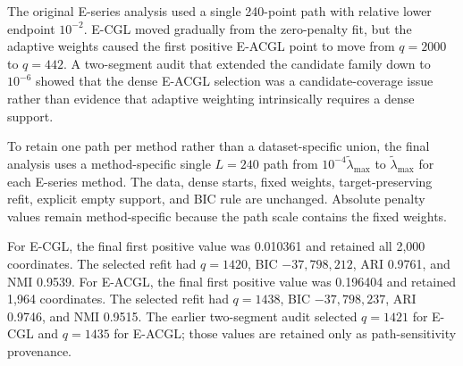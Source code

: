 \documentclass[preprint,12pt,authoryear]{elsarticle}
\begin{document}
The original E-series analysis used a single 240-point path with relative
lower endpoint $10^{-2}$. E-CGL moved gradually from the zero-penalty fit, but
the adaptive weights caused the first positive E-ACGL point to move from
$q=2000$ to $q=442$. A two-segment audit that extended the candidate family
down to $10^{-6}$ showed that the dense E-ACGL selection was a
candidate-coverage issue rather than evidence that adaptive weighting intrinsically
requires a dense support.

To retain one path per method rather than a dataset-specific union, the final
analysis uses a method-specific single $L=240$ path from
$10^{-4}\widetilde\lambda_{\max}$ to $\widetilde\lambda_{\max}$ for each
E-series method. The data, dense starts,
fixed weights, target-preserving refit, explicit empty support, and BIC rule
are unchanged. Absolute penalty values remain method-specific because the
path scale contains the fixed weights.

For E-CGL, the final first positive value was 0.010361 and retained all 2,000
coordinates. The selected refit had $q=1420$, BIC $-37{,}798{,}212$, ARI
0.9761, and NMI 0.9539. For E-ACGL, the final first positive value was 0.196404
and retained 1,964 coordinates. The selected refit had $q=1438$, BIC
$-37{,}798{,}237$, ARI 0.9746, and NMI 0.9515. The earlier two-segment audit
selected $q=1421$ for E-CGL and $q=1435$ for E-ACGL; those values are retained
only as path-sensitivity provenance.

\begin{table}[H]
\centering
\scriptsize
\setlength{\tabcolsep}{2.5pt}
\caption{Candidate-path sensitivity of the E-series methods in Classic3.
The final rows use one 240-point path with relative lower endpoint $10^{-4}$;
the other rows record the preceding diagnostics.}
\label{tab:s-classic3-paths}
\end{table}
\end{document}
